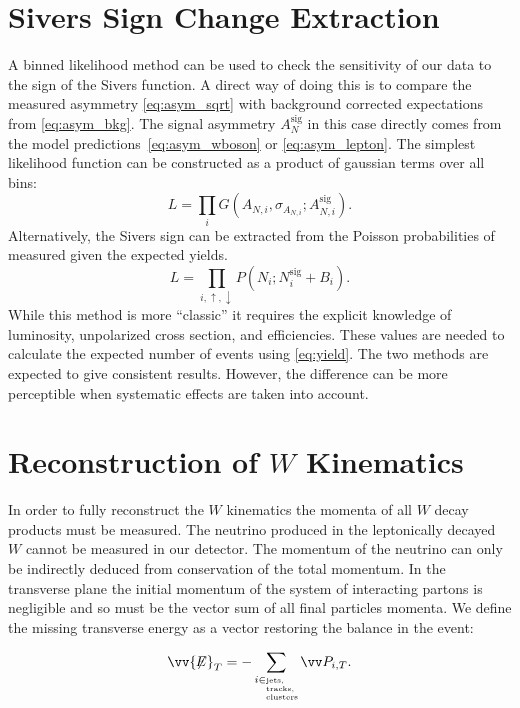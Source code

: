 \documentclass[12pt]{article}
\newcommand{\missET}{\vv{\not{\!\!E}}_T}
\begin{document}


\section{Sivers Sign Change Extraction}

A binned likelihood method can be used to check the sensitivity of our data to
the sign of the Sivers function. A direct way of doing this is to compare the
measured asymmetry \eqref{eq:asym_sqrt} with background corrected expectations
from \eqref{eq:asym_bkg}. The signal asymmetry $A^\text{sig}_N$ in this case
directly comes from the model predictions~\eqref{eq:asym_wboson} or
\eqref{eq:asym_lepton}. The simplest likelihood function can be constructed as a
product of gaussian terms over all bins:
%
\begin{equation}
L = \prod\limits_i G(A_{N,i}, \sigma_{A_{N,i}}; A^\text{sig}_{N,i}).
\end{equation}
%
Alternatively, the Sivers sign can be extracted from the Poisson probabilities
of measured given the expected yields.
%
\begin{equation}
L = \prod\limits_{i,\uparrow,\downarrow} P(N_i; N^\text{sig}_{i} + B_i).
\end{equation}
%
While this method is more ``classic'' it requires the explicit knowledge of
luminosity, unpolarized cross section, and efficiencies. These values are
needed to calculate the expected number of events using \eqref{eq:yield}. The
two methods are expected to give consistent results. However, the difference
can be more perceptible when systematic effects are taken into account.



\section{Reconstruction of $W$ Kinematics}

In order to fully reconstruct the $W$ kinematics the momenta of all $W$ decay
products must be measured. The neutrino produced in the leptonically decayed $W$
cannot be measured in our detector. The momentum of the neutrino can only be
indirectly deduced from conservation of the total momentum. In the transverse
plane the initial momentum of the system of interacting partons is negligible
and so must be the vector sum of all final particles momenta. We define the
missing transverse energy as a vector restoring the balance in the event:

\begin{equation}
\missET = - \sum_{i \in \parbox[t]{\widthof{\tiny clusters}}{\tiny jets, tracks, clusters}} \vv P_{i,T}.
\end{equation}
\end{document}

